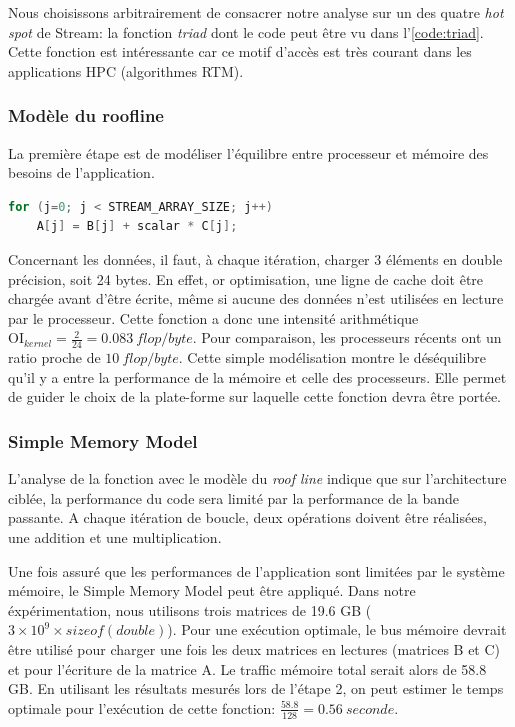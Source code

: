 Nous choisissons arbitrairement de consacrer notre analyse sur un des quatre \textit{hot spot} de Stream: la fonction \textit{triad} dont le code peut être vu dans l'\autoref{code:triad}. Cette fonction est intéressante car ce motif d'accès est très courant dans les applications HPC (algorithmes RTM).

\subsubsection{Modèle du roofline}
La première étape est de modéliser l'équilibre entre processeur et mémoire des besoins de l'application. 

\begin{lstlisting}[language=c,caption= La fonction triad du benchmark Stream utilise trois matrices: deux en lecture et une en écriture,label={code:triad}, 
  basicstyle=\footnotesize, frame=tb,
  xleftmargin=.065\textwidth, xrightmargin=.065\textwidth]
for (j=0; j < STREAM_ARRAY_SIZE; j++)
    A[j] = B[j] + scalar * C[j];
\end{lstlisting}


Concernant les données, il faut, à chaque itération, charger 3 éléments en double précision, soit 24 bytes. En effet, or optimisation, une ligne de cache doit être chargée avant d'être écrite, même si aucune des données n'est utilisées en lecture par le processeur. Cette fonction a donc une intensité arithmétique $\text{OI}_{kernel} = \frac{2}{24} = 0.083\ flop/byte$.
Pour comparaison, les processeurs récents ont un ratio proche de $10\ flop/byte$. Cette simple modélisation montre le déséquilibre qu'il y a entre la performance de la mémoire et celle des processeurs. Elle permet de guider le choix de la plate-forme sur laquelle cette fonction devra être portée.



\subsubsection{Simple Memory Model}
L'analyse de la fonction avec le modèle du \textit{roof line} indique que sur l'architecture ciblée, la performance du code sera limité par la performance de la bande passante.
A chaque itération de boucle, deux opérations doivent être réalisées, une addition et une multiplication. 

Une fois assuré que les performances de l'application sont limitées par le système mémoire, le Simple Memory Model peut être appliqué. Dans notre éxpérimentation, nous utilisons trois matrices de 19.6 GB ($3 \times 10^9 \times sizeof(double)$). Pour une exécution optimale, le bus mémoire devrait être utilisé pour charger une fois les deux matrices en lectures (matrices B et C)  et pour l'écriture de la matrice A. Le traffic mémoire total serait alors de 58.8 GB. En utilisant les résultats mesurés lors de l'étape 2, on peut estimer le temps optimale pour l'exécution de cette fonction: $ \frac{58.8}{128} = 0.56\ seconde$.








